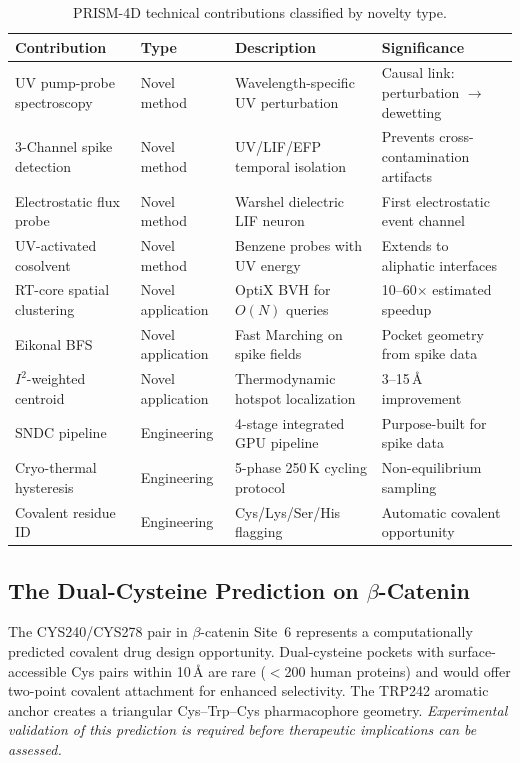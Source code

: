 \documentclass{sn-jnl}
\begin{document}
\begin{table}[t]
\centering
\caption{PRISM-4D technical contributions classified by novelty type.}
\label{tab:innovations}
\begin{tabular}{llll}
\toprule
\textbf{Contribution} & \textbf{Type} & \textbf{Description} & \textbf{Significance} \\
\midrule
UV pump-probe spectroscopy & Novel method & Wavelength-specific UV perturbation & Causal link: perturbation $\to$ dewetting \\
3-Channel spike detection & Novel method & UV/LIF/EFP temporal isolation & Prevents cross-contamination artifacts \\
Electrostatic flux probe & Novel method & Warshel dielectric LIF neuron & First electrostatic event channel \\
UV-activated cosolvent & Novel method & Benzene probes with UV energy & Extends to aliphatic interfaces \\
RT-core spatial clustering & Novel application & OptiX BVH for $O(N)$ queries & 10--60$\times$ estimated speedup \\
Eikonal BFS & Novel application & Fast Marching on spike fields & Pocket geometry from spike data \\
$I^2$-weighted centroid & Novel application & Thermodynamic hotspot localization & 3--15\,\AA{} improvement \\
SNDC pipeline & Engineering & 4-stage integrated GPU pipeline & Purpose-built for spike data \\
Cryo-thermal hysteresis & Engineering & 5-phase 250\,K cycling protocol & Non-equilibrium sampling \\
Covalent residue ID & Engineering & Cys/Lys/Ser/His flagging & Automatic covalent opportunity \\
\bottomrule
\end{tabular}
\end{table}

\subsection{The Dual-Cysteine Prediction on \texorpdfstring{$\beta$}{Beta}-Catenin}

The CYS240/CYS278 pair in $\beta$-catenin Site~6 represents a computationally predicted
covalent drug design opportunity. Dual-cysteine pockets with surface-accessible Cys pairs
within 10\,\AA{} are rare ($<$200 human proteins) and would offer two-point covalent
attachment for enhanced selectivity. The TRP242 aromatic anchor creates a triangular
Cys--Trp--Cys pharmacophore geometry. \textit{Experimental validation of this prediction is
required before therapeutic implications can be assessed.}
\end{document}
